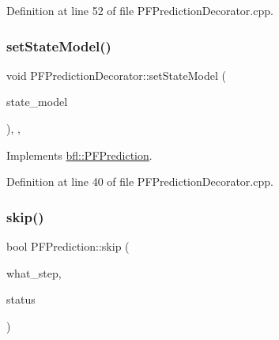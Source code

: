 Definition at line 52 of file P\+F\+Prediction\+Decorator.\+cpp.

\mbox{\label{classbfl_1_1PFPredictionDecorator_ad269dfbdecf19d67717a8bc44f0bd286}} 
\subsubsection{\texorpdfstring{set\+State\+Model()}{setStateModel()}}
{\footnotesize\ttfamily void P\+F\+Prediction\+Decorator\+::set\+State\+Model (\begin{DoxyParamCaption}\item[{std\+::unique\+\_\+ptr$<$ \mbox{\hyperlink{classbfl_1_1StateModel}{State\+Model}} $>$}]{state\+\_\+model }\end{DoxyParamCaption})\hspace{0.3cm}{\ttfamily [override]}, {\ttfamily [protected]}, {\ttfamily [virtual]}}



Implements \mbox{\hyperlink{classbfl_1_1PFPrediction_ac39683650d7f89c59f1426dd7743354e}{bfl\+::\+P\+F\+Prediction}}.



Definition at line 40 of file P\+F\+Prediction\+Decorator.\+cpp.

\mbox{\label{classbfl_1_1PFPrediction_a364cc35a151e5298c4024d681f3e04d9}} 
\subsubsection{\texorpdfstring{skip()}{skip()}}
{\footnotesize\ttfamily bool P\+F\+Prediction\+::skip (\begin{DoxyParamCaption}\item[{const std\+::string \&}]{what\+\_\+step,  }\item[{const bool}]{status }\end{DoxyParamCaption})\hspace{0.3cm}{\ttfamily [inherited]}}



